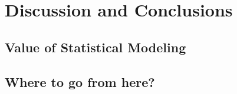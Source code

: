 \chapter{Discussion and Conclusions}\label{chap:discussion}
\section{Value of Statistical Modeling}
\blindtext

\section{Where to go from here?}
\blindtext